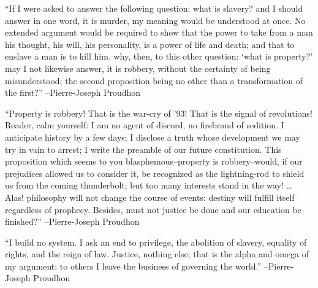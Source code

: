 \documentclass{article}%
\begin{document}
\vspace{1mm}%
\begin{minipage}{\textwidth}%
\flushleft%
“If I were asked to answer the following question: what is slavery? and I should answer in one word, it is murder, my meaning would be understood at once. No extended argument would be required to show that the power to take from a man his thought, his will, his personality, is a power of life and death; and that to enslave a man is to kill him. why, then, to this other question: ‘what is property?’ may I not likewise answer, it is robbery, without the certainty of being misunderstood; the second proposition being no other than a transformation of the first?”%
\linebreak%
\vspace{1mm}%
–Pierre{-}Joseph Proudhon%
\linebreak%
\vspace{1mm}%
\end{minipage}%
\linebreak%
\vspace{1mm}%
\begin{minipage}{\textwidth}%
\flushleft%
“Property is robbery! That is the war{-}cry of '93! That is the signal of revolutions! Reader, calm yourself: I am no agent of discord, no firebrand of sedition. I anticipate history by a few days; I disclose a truth whose development we may try in vain to arrest; I write the preamble of our future constitution. This proposition which seems to you blasphemous–property is robbery–would, if our prejudices allowed us to consider it, be recognized as the lightning{-}rod to shield us from the coming thunderbolt; but too many interests stand in the way! … Alas! philosophy will not change the course of events: destiny will fulfill itself regardless of prophecy. Besides, must not justice be done and our education be finished?”%
\linebreak%
\vspace{1mm}%
–Pierre{-}Joseph Proudhon%
\linebreak%
\vspace{1mm}%
\end{minipage}%
\linebreak%
\vspace{1mm}%
\begin{minipage}{\textwidth}%
\flushleft%
“I build no system. I ask an end to privilege, the abolition of slavery, equality of rights, and the reign of law. Justice, nothing else; that is the alpha and omega of my argument: to others I leave the business of governing the world.”%
\linebreak%
\vspace{1mm}%
–Pierre{-}Joseph Proudhon%
\linebreak%
\vspace{1mm}%
\end{minipage}%
\end{document}
